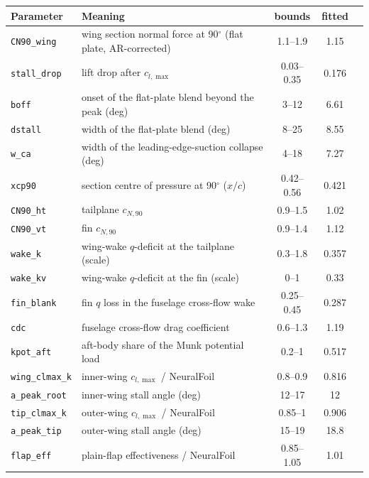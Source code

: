\begin{tabular}{llccc}
\toprule
Parameter & Meaning & bounds & fitted \\
\midrule
\texttt{CN90\_wing} & wing section normal force at 90$^\circ$ (flat plate, AR-corrected) & 1.1--1.9 & 1.15 \\
\texttt{stall\_drop} & lift drop after $c_{l,\max}$ & 0.03--0.35 & 0.176 \\
\texttt{boff} & onset of the flat-plate blend beyond the peak (deg) & 3--12 & 6.61 \\
\texttt{dstall} & width of the flat-plate blend (deg) & 8--25 & 8.55 \\
\texttt{w\_ca} & width of the leading-edge-suction collapse (deg) & 4--18 & 7.27 \\
\texttt{xcp90} & section centre of pressure at 90$^\circ$ ($x/c$) & 0.42--0.56 & 0.421 \\
\texttt{CN90\_ht} & tailplane $c_{N,90}$ & 0.9--1.5 & 1.02 \\
\texttt{CN90\_vt} & fin $c_{N,90}$ & 0.9--1.4 & 1.12 \\
\texttt{wake\_k} & wing-wake $q$-deficit at the tailplane (scale) & 0.3--1.8 & 0.357 \\
\texttt{wake\_kv} & wing-wake $q$-deficit at the fin (scale) & 0--1 & 0.33 \\
\texttt{fin\_blank} & fin $q$ loss in the fuselage cross-flow wake & 0.25--0.45 & 0.287 \\
\texttt{cdc} & fuselage cross-flow drag coefficient & 0.6--1.3 & 1.19 \\
\texttt{kpot\_aft} & aft-body share of the Munk potential load & 0.2--1 & 0.517 \\
\texttt{wing\_clmax\_k} & inner-wing $c_{l,\max}$ / NeuralFoil & 0.8--0.9 & 0.816 \\
\texttt{a\_peak\_root} & inner-wing stall angle (deg) & 12--17 & 12 \\
\texttt{tip\_clmax\_k} & outer-wing $c_{l,\max}$ / NeuralFoil & 0.85--1 & 0.906 \\
\texttt{a\_peak\_tip} & outer-wing stall angle (deg) & 15--19 & 18.8 \\
\texttt{flap\_eff} & plain-flap effectiveness / NeuralFoil & 0.85--1.05 & 1.01 \\
\bottomrule
\end{tabular}

